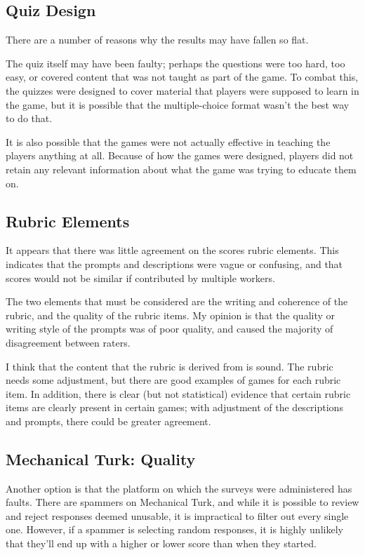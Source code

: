 \documentclass[12pt]{report}
\begin{document}
		\subsection{Quiz Design}

			There are a number of reasons why the results may have fallen so flat.

			The quiz itself may have been faulty; perhaps the questions were too hard, too easy, or covered content that was not taught as part of the game. To combat this, the quizzes were designed to cover material that players were supposed to learn in the game, but it is possible that the multiple-choice format wasn't the best way to do that.

			It is also possible that the games were not actually effective in teaching the players anything at all. Because of how the games were designed, players did not retain any relevant information about what the game was trying to educate them on.

		\subsection{Rubric Elements}

			It appears that there was little agreement on the scores rubric elements. This indicates that the prompts and descriptions were vague or confusing, and that scores would not be similar if contributed by multiple workers.

			The two elements that must be considered are the writing and coherence of the rubric, and the quality of the rubric items. My opinion is that the quality or writing style of the prompts was of poor quality, and caused the majority of disagreement between raters.

			I think that the content that the rubric is derived from is sound. The rubric needs some adjustment, but there are good examples of games for each rubric item. In addition, there is clear (but not statistical) evidence that certain rubric items are clearly present in certain games; with adjustment of the descriptions and prompts, there could be greater agreement.  

		\subsection{Mechanical Turk: Quality}

			Another option is that the platform on which the surveys were administered has faults. There are spammers on Mechanical Turk, and while it is possible to review and reject responses deemed unusable, it is impractical to filter out every single one. However, if a spammer is selecting random responses, it is highly unlikely that they'll end up with a higher or lower score than when they started. 
\end{document}
